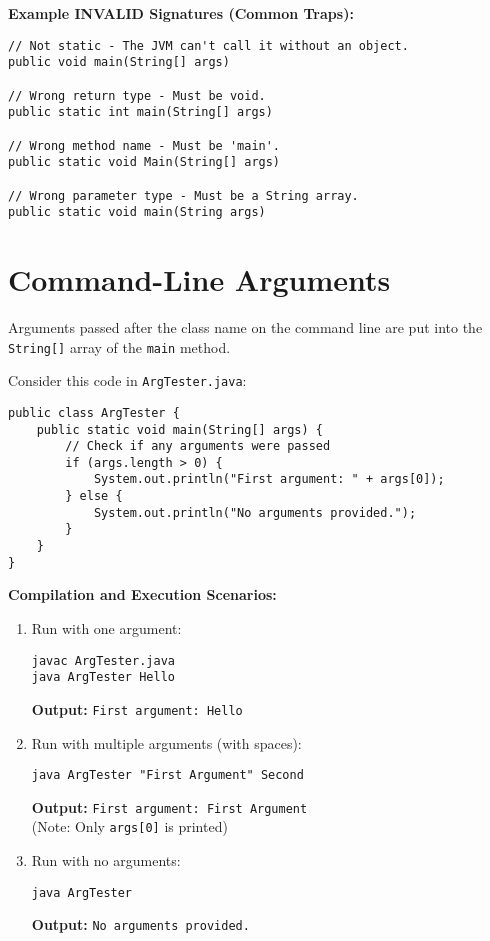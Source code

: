 \documentclass[12pt]{article}
\begin{document}
\begin{enumerate}[label=(\arabic*)]
\textbf{Example INVALID Signatures (Common Traps):}
\begin{verbatim}
// Not static - The JVM can't call it without an object.
public void main(String[] args)

// Wrong return type - Must be void.
public static int main(String[] args)

// Wrong method name - Must be 'main'.
public static void Main(String[] args)

// Wrong parameter type - Must be a String array.
public static void main(String args)
\end{verbatim}

\section{Command-Line Arguments}
Arguments passed after the class name on the command line are put into the \texttt{String[]} array of the \texttt{main} method.

Consider this code in \texttt{ArgTester.java}:
\begin{verbatim}
public class ArgTester {
    public static void main(String[] args) {
        // Check if any arguments were passed
        if (args.length > 0) {
            System.out.println("First argument: " + args[0]);
        } else {
            System.out.println("No arguments provided.");
        }
    }
}
\end{verbatim}

\textbf{Compilation and Execution Scenarios:}
\begin{enumerate}
    \item Run with one argument:
    \begin{verbatim}
javac ArgTester.java
java ArgTester Hello
    \end{verbatim}
    \textbf{Output:} \texttt{First argument: Hello}

    \item Run with multiple arguments (with spaces):
    \begin{verbatim}
java ArgTester "First Argument" Second
    \end{verbatim}
    \textbf{Output:} \texttt{First argument: First Argument} \\ (Note: Only \texttt{args[0]} is printed)

    \item Run with no arguments:
    \begin{verbatim}
java ArgTester
    \end{verbatim}
    \textbf{Output:} \texttt{No arguments provided.}


\end{enumerate}
\end{enumerate}
\end{document}
